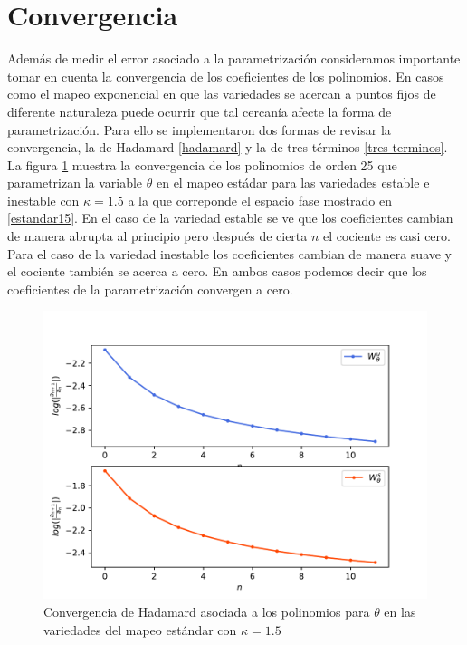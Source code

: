 \section{Convergencia}
Además de medir el error asociado a la parametrización consideramos importante tomar en cuenta la convergencia de los coeficientes de los polinomios. En casos como el mapeo exponencial en que las variedades se acercan a puntos fijos de diferente naturaleza puede ocurrir que tal cercanía afecte la forma de parametrización. Para ello se implementaron dos formas de revisar la convergencia, la de Hadamard \ref{hadamard} y la de tres términos \ref{tres terminos}. \\

La figura \ref{convergenciaEst15} muestra la convergencia de los polinomios de orden 25 que parametrizan la variable $\theta$ en el mapeo estádar para las variedades estable e inestable con $\kappa=1.5$ a la que correponde el espacio fase mostrado en \ref{estandar15}. En el caso de la variedad estable se ve que los coeficientes cambian de manera abrupta al principio pero después de cierta $n$ el cociente es casi cero. Para el caso de la variedad inestable los coeficientes cambian de manera suave y el cociente también se acerca a cero. En ambos casos podemos decir que los coeficientes de la parametrización convergen a cero.  
\begin{figure}[H]
\centering
\includegraphics[scale=0.5]{converEst15}
\caption{Convergencia de Hadamard asociada a los polinomios para $\theta$ en las variedades del mapeo estándar con $\kappa=1.5$}
\label{convergenciaEst15}
\end{figure}

